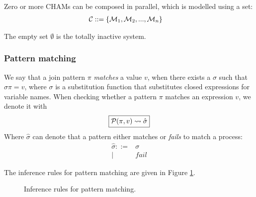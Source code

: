 Zero or more CHAMs can be composed in parallel, which is modelled using a set:
\begin{align*}
 \C ::={}& \{ \M_1, \M_2, ..., \M_n \}
\end{align*}

The empty set $\emptyset$ is the totally inactive system.

\subsubsection{Pattern matching}
We say that a join pattern $\pi$ \emph{matches} a value $v$, when there exists
a $\sigma$ such that $\sigma \pi = v$, where $\sigma$ is a substitution
function that substitutes closed expressions for variable names.
When checking whether a pattern $\pi$ matches an expression $v$, we denote it
with
\begin{equation*}
  \boxed{\P(\pi,v) \leadsto \hat\sigma}
\end{equation*}
Where $\hat\sigma$ can denote that a pattern either matches or \emph{fails} to
match a process:
\begin{align*}
 \hat\sigma ::={}& \sigma \\
         |\quad{}& fail
\end{align*}

The inference rules for pattern matching are given in Figure \ref{fig:rule:pat}.

\begin{figure}[!h]
\caption{Inference rules for pattern matching.} \label{fig:rule:pat}
\end{figure}

